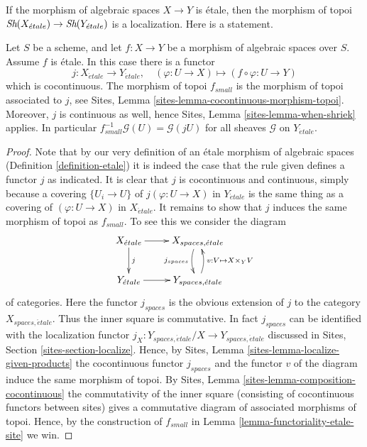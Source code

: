 \noindent
If the morphism of algebraic spaces $X \to Y$ is \'etale, then the morphism
of topoi $\mathop{\textit{Sh}}\nolimits(X_{\acute{e}tale}) \to \mathop{\textit{Sh}}\nolimits(Y_{\acute{e}tale})$
is a localization. Here is a statement.

\begin{lemma}
\label{lemma-etale-morphism-topoi}
Let $S$ be a scheme, and let $f : X \to Y$ be a morphism of algebraic spaces
over $S$. Assume $f$ is \'etale. In this case there is a functor
$$
j : X_{\acute{e}tale} \to Y_{\acute{e}tale}, \quad
(\varphi : U \to X) \mapsto (f \circ \varphi : U \to Y)
$$
which is cocontinuous. The morphism of topoi $f_{small}$ is the
morphism of topoi associated to $j$, see
Sites, Lemma \ref{sites-lemma-cocontinuous-morphism-topoi}.
Moreover, $j$ is continuous as well, hence
Sites, Lemma \ref{sites-lemma-when-shriek}
applies. In particular $f_{small}^{-1}\mathcal{G}(U) = \mathcal{G}(jU)$
for all sheaves $\mathcal{G}$ on $Y_{\acute{e}tale}$.
\end{lemma}

\begin{proof}
Note that by our very definition of an \'etale morphism of algebraic spaces
(Definition \ref{definition-etale}) it is
indeed the case that the rule given defines a functor $j$ as indicated.
It is clear that $j$ is cocontinuous and continuous, simply because a covering
$\{U_i \to U\}$ of $j(\varphi : U \to X)$ in $Y_{\acute{e}tale}$ is the
same thing as a covering of $(\varphi : U \to X)$ in $X_{\acute{e}tale}$. It
remains to show that $j$ induces the same morphism of topoi as $f_{small}$.
To see this we consider the diagram
$$
\xymatrix{
X_{\acute{e}tale} \ar[r] \ar[d]^j &
X_{spaces, \acute{e}tale} \ar@/_/[d]_{j_{spaces}} \\
Y_{\acute{e}tale} \ar[r] &
Y_{spaces, \acute{e}tale} \ar@/_/[u]_{v : V \mapsto X \times_Y V}
}
$$
of categories. Here the functor $j_{spaces}$ is the obvious extension of $j$
to the category $X_{spaces, \acute{e}tale}$. Thus the inner square is
commutative. In fact $j_{spaces}$ can be identified with the
localization functor
$j_X : Y_{spaces, \acute{e}tale}/X \to Y_{spaces, \acute{e}tale}$
discussed in
Sites, Section \ref{sites-section-localize}.
Hence, by
Sites, Lemma \ref{sites-lemma-localize-given-products}
the cocontinuous functor $j_{spaces}$ and the functor $v$ of the diagram
induce the same morphism of topoi. By
Sites, Lemma \ref{sites-lemma-composition-cocontinuous}
the commutativity of the inner square (consisting of cocontinuous functors
between sites) gives a commutative diagram of associated morphisms of topoi.
Hence, by the construction of $f_{small}$ in
Lemma \ref{lemma-functoriality-etale-site} we win.
\end{proof}

